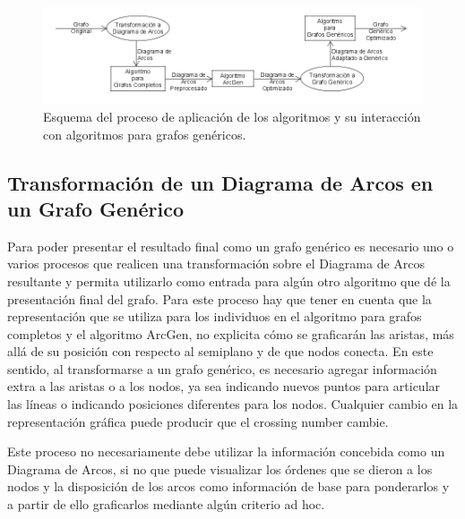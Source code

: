 \begin{figure}
	\centering
	\includegraphics[width=16cm]{imagenes/integracion_generico_diseno.png}
	\caption{Esquema del proceso de aplicación de los algoritmos y su interacción con algoritmos para grafos genéricos.}
	\label{fig:integracion_generico_diseno}
\end{figure}

\subsection{Transformación de un Diagrama de Arcos en un Grafo Genérico}
\label{sec:transformacion_generico}
Para poder presentar el resultado final como un grafo genérico es necesario uno o varios procesos que realicen una transformación sobre el Diagrama de Arcos resultante y permita utilizarlo como entrada para algún otro algoritmo que dé la presentación final del grafo. Para este proceso hay que tener en cuenta que la representación que se utiliza para los individuos en el algoritmo para grafos completos y el algoritmo ArcGen, no explicita cómo se graficarán las aristas, más allá de su posición con respecto al semiplano y de que nodos conecta. En este sentido, al transformarse a un grafo genérico, es necesario agregar información extra a las aristas o a los nodos, ya sea indicando nuevos puntos para articular las líneas o indicando posiciones diferentes para los nodos. Cualquier cambio en la representación gráfica puede producir que el crossing number cambie.

Este proceso no necesariamente debe utilizar la información concebida como un Diagrama de Arcos, si no que puede visualizar los órdenes que se dieron a los nodos y la disposición de los arcos como información de base para ponderarlos y a partir de ello graficarlos mediante algún criterio ad hoc.